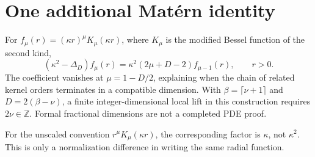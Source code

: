 \section{One additional Matérn identity}
\label{app:matern}
For $f_\mu(r)=(\kappa r)^\mu K_\mu(\kappa r)$, where $K_\mu$ is the modified Bessel function of the second kind,
\begin{equation}
 (\kappa^2-\Delta_D)f_\mu(r)
 =\kappa^2(2\mu+D-2)f_{\mu-1}(r),\qquad r>0.
 \label{eq:matern-identity}
\end{equation}
The coefficient vanishes at $\mu=1-D/2$, explaining when the chain of related kernel orders terminates in a compatible dimension. With $\beta=\lceil\nu+1\rceil$ and $D=2(\beta-\nu)$, a finite integer-dimensional local lift in this construction requires $2\nu\in\mathbb Z$. Formal fractional dimensions are not a completed PDE proof.

For the unscaled convention $r^\mu K_\mu(\kappa r)$, the corresponding factor is $\kappa$, not $\kappa^2$. This is only a normalization difference in writing the same radial function.

